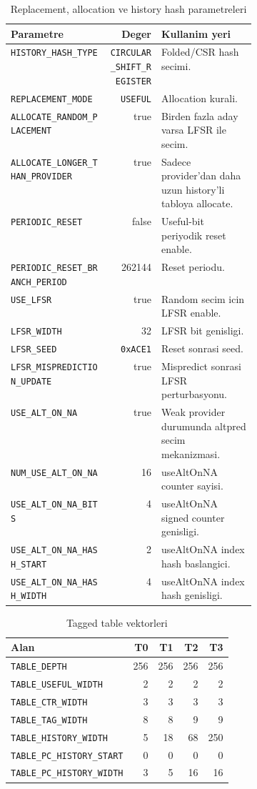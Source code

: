 \documentclass[11pt,a4paper]{article}
\newcommand{\code}[1]{\texttt{#1}}
\newcommand{\param}[1]{\texttt{#1}}
\begin{document}
\begin{table}[!htbp]
\centering
\caption{Replacement, allocation ve history hash parametreleri}
\label{tab:alloc-params}
\small
\begin{tabularx}{\linewidth}{@{}>{\raggedright\arraybackslash}p{0.40\linewidth}rY@{}}
\toprule
Parametre & Deger & Kullanim yeri \\
\midrule
\param{HISTORY\_HASH\_TYPE} & \code{CIRCULAR\_SHIFT\_REGISTER} & Folded/CSR hash secimi. \\
\param{REPLACEMENT\_MODE} & \code{USEFUL} & Allocation kurali. \\
\param{ALLOCATE\_RANDOM\_PLACEMENT} & true & Birden fazla aday varsa LFSR ile secim. \\
\param{ALLOCATE\_LONGER\_THAN\_PROVIDER} & true & Sadece provider'dan daha uzun history'li tabloya allocate. \\
\param{PERIODIC\_RESET} & false & Useful-bit periyodik reset enable. \\
\param{PERIODIC\_RESET\_BRANCH\_PERIOD} & 262144 & Reset periodu. \\
\param{USE\_LFSR} & true & Random secim icin LFSR enable. \\
\param{LFSR\_WIDTH} & 32 & LFSR bit genisligi. \\
\param{LFSR\_SEED} & \code{0xACE1} & Reset sonrasi seed. \\
\param{LFSR\_MISPREDICTION\_UPDATE} & true & Mispredict sonrasi LFSR perturbasyonu. \\
\param{USE\_ALT\_ON\_NA} & true & Weak provider durumunda altpred secim mekanizmasi. \\
\param{NUM\_USE\_ALT\_ON\_NA} & 16 & useAltOnNA counter sayisi. \\
\param{USE\_ALT\_ON\_NA\_BITS} & 4 & useAltOnNA signed counter genisligi. \\
\param{USE\_ALT\_ON\_NA\_HASH\_START} & 2 & useAltOnNA index hash baslangici. \\
\param{USE\_ALT\_ON\_NA\_HASH\_WIDTH} & 4 & useAltOnNA index hash genisligi. \\
\bottomrule
\end{tabularx}
\end{table}

\begin{table}[!htbp]
\centering
\caption{Tagged table vektorleri}
\label{tab:table-vectors}
\small
\begin{tabular}{lrrrr}
\toprule
Alan & T0 & T1 & T2 & T3 \\
\midrule
\param{TABLE\_DEPTH} & 256 & 256 & 256 & 256 \\
\param{TABLE\_USEFUL\_WIDTH} & 2 & 2 & 2 & 2 \\
\param{TABLE\_CTR\_WIDTH} & 3 & 3 & 3 & 3 \\
\param{TABLE\_TAG\_WIDTH} & 8 & 8 & 9 & 9 \\
\param{TABLE\_HISTORY\_WIDTH} & 5 & 18 & 68 & 250 \\
\param{TABLE\_PC\_HISTORY\_START} & 0 & 0 & 0 & 0 \\
\param{TABLE\_PC\_HISTORY\_WIDTH} & 3 & 5 & 16 & 16 \\
\bottomrule
\end{tabular}
\end{table}
\end{document}
